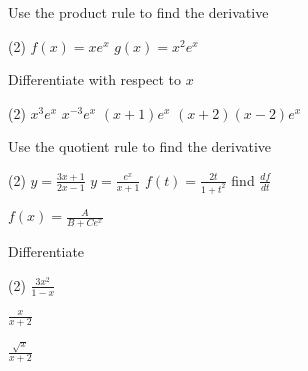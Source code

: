\begin{Exercise}[title={Rate of Change},label=exRateOfChange]
\begin{Exercise}[title={Product, Quotient, & Chain Rules},label=exPQCRules]
	\Question Use the product rule to find the derivative
	\begin{tasks}(2)
		\task  $f (x) =x e^{x}$ %
		\task $g (x) =x^{2} e^{x}$ %
	\end{tasks}
	
	\Question Differentiate with respect to $x$ 
	\begin{tasks}(2)
		\task $x^{3} e^{x}$ %
		\task $x^{ -3} e^{x}$ %
		\task $\left (x +1\right ) e^{x}$ %
		\task $\left (x +2\right ) \left (x -2\right ) e^{x}$ %
	\end{tasks}

	\Question Use the quotient rule to find the derivative
\begin{tasks}(2)
	\task  $y =\frac{3 x +1}{2 x -1}$ %
	\task $y =\frac{e^{x}}{x +1}$ %
	\task $f (t) =\frac{2 t}{1 +t^{2}}$ find $\frac{d f}{d t}$ %
	
	\task $f (x) =\frac{A}{B +C e^{x}}$ %
\end{tasks}

\Question Differentiate
\begin{tasks}(2)
	\task $\frac{3 x^{2}}{1 -x}$ %
	
	\task $\frac{x}{x +2}$ %
	
	\task $\frac{\sqrt{x}}{x +2}$ %
	

\end{tasks}
\end{Exercise}
\end{Exercise}
